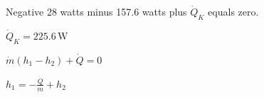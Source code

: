 Negative 28 watts minus 157.6 watts plus \( \dot{Q}_K \) equals zero.  

\( \dot{Q}_K = 225.6 \, \text{W} \)  

\( \dot{m} (h_1 - h_2) + \dot{Q} = 0 \)  

\( h_1 = - \frac{\dot{Q}}{m} + h_2 \)